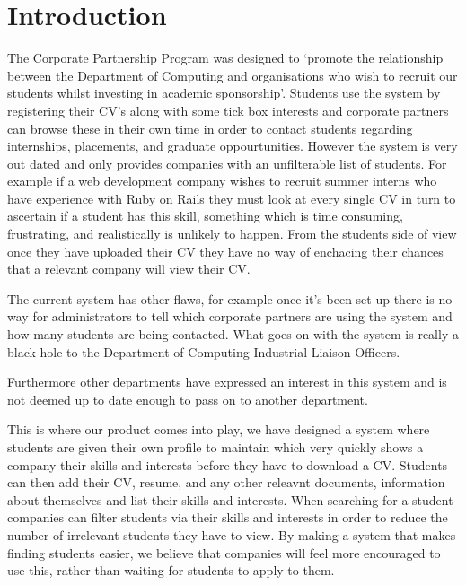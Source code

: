 \section{Introduction}
The Corporate Partnership Program was designed to `promote the relationship between the Department of Computing and organisations who wish to recruit our students whilst investing in academic sponsorship'.
Students use the system by registering their CV's along with some tick box interests and corporate partners can browse these in their own time in order to contact students regarding internships, placements, and graduate oppourtunities.
However the system is very out dated and only provides companies with an unfilterable list of students. For example if a web development company wishes to recruit summer interns who have experience with Ruby on Rails they must look at every single CV in turn to ascertain if a student has this skill, something which is time consuming, frustrating, and realistically is unlikely to happen.
From the students side of view once they have uploaded their CV they have no way of enchacing their chances that a relevant company will view their CV.

The current system has other flaws, for example once it's been set up there is no way for administrators to tell which corporate partners are using the system and how many students are being contacted. What goes on with the system is really a black hole to the Department of Computing Industrial Liaison Officers. 

Furthermore other departments have expressed an interest in this system and is not deemed up to date enough to pass on to another department.

This is where our product comes into play, we have designed a system where students are given their own profile to maintain which very quickly shows a company their skills and interests before they have to download a CV. Students can then add their CV, resume, and any other releavnt documents, information about themselves and list their skills and interests.
When searching for a student companies can filter students via their skills and interests in order to reduce the number of irrelevant students they have to view. By making a system that makes finding students easier, we believe that companies will feel more encouraged to use this, rather than waiting 
for students to apply to them.

